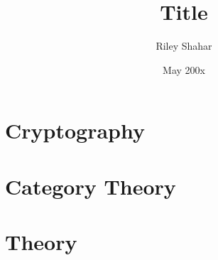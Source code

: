\documentclass[12pt,nobib,nohyper]{tufte-book}
\title{Title} %
\author{Riley Shahar}
\date{May 200x} %
\begin{document}
\maketitle
\frontmatter
\pagestyle{empty} %




\tableofcontents
\listoftables
\listoffigures



\mainmatter%
\pagestyle{fancyplain} %


\chapter{Cryptography}


\chapter{Category Theory}


\backmatter{}
\nocite{*}
\printbibliography

\appendix
\chapter{Theory}


\end{document}
